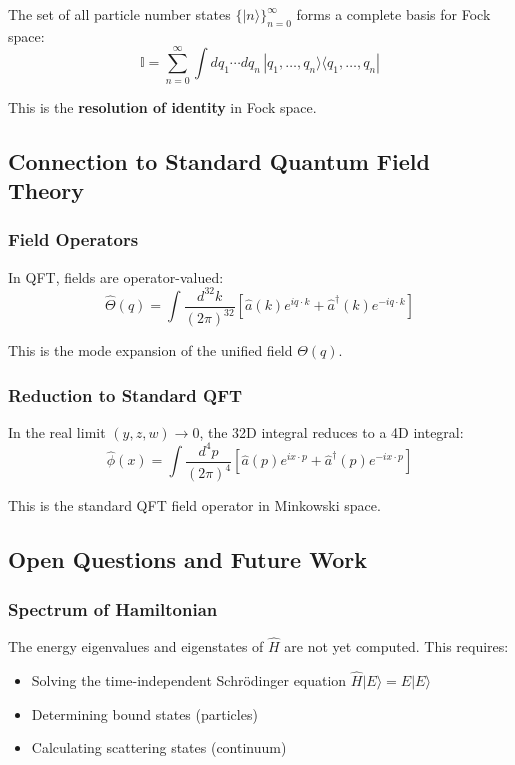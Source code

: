 The set of all particle number states $\{|n\rangle\}_{n=0}^{\infty}$ forms a complete basis for Fock space:
\begin{equation}
\mathbb{I} = \sum_{n=0}^{\infty} \int dq_1 \cdots dq_n \, |q_1, \dots, q_n\rangle \langle q_1, \dots, q_n|
\end{equation}

This is the \textbf{resolution of identity} in Fock space.

\subsection{Connection to Standard Quantum Field Theory}

\subsubsection{Field Operators}

In QFT, fields are operator-valued:
\begin{equation}
\hat{\Theta}(q) = \int \frac{d^{32}k}{(2\pi)^{32}} \left[\hat{a}(k) e^{iq \cdot k} + \hat{a}^{\dagger}(k) e^{-iq \cdot k}\right]
\end{equation}

This is the mode expansion of the unified field $\Theta(q)$.

\subsubsection{Reduction to Standard QFT}

In the real limit $(y, z, w) \to 0$, the 32D integral reduces to a 4D integral:
\begin{equation}
\hat{\phi}(x) = \int \frac{d^4p}{(2\pi)^4} \left[\hat{a}(p) e^{ix \cdot p} + \hat{a}^{\dagger}(p) e^{-ix \cdot p}\right]
\end{equation}

This is the standard QFT field operator in Minkowski space.

\subsection{Open Questions and Future Work}

\subsubsection{Spectrum of Hamiltonian}

The energy eigenvalues and eigenstates of $\hat{H}$ are not yet computed. This requires:
\begin{itemize}
\item Solving the time-independent Schrödinger equation $\hat{H} |E\rangle = E |E\rangle$
\item Determining bound states (particles)
\item Calculating scattering states (continuum)
\end{itemize}

